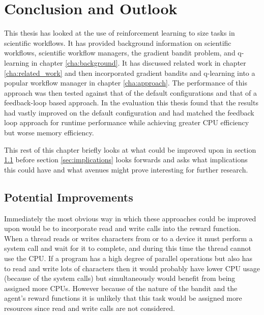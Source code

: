 
\cleardoublepage
\chapter{Conclusion and Outlook}
\label{cha:conclusion}

This thesis has looked at the use of reinforcement learning to size tasks in scientific workflows. It has provided background information on scientific workflows, scientific workflow managers, the gradient bandit problem, and q-learning in chapter \ref{cha:background}. It has discussed related work in chapter \ref{cha:related_work} and then incorporated gradient bandits and q-learning into a popular workflow manager in chapter \ref{cha:approach}. The performance of this approach was then tested against that of the default configurations and that of a feedback-loop based approach. In the evaluation this thesis found that the results had vastly improved on the default configuration and had matched the feedback loop approach for runtime performance while achieving greater CPU efficiency but worse memory efficiency.

This rest of this chapter briefly looks at what could be improved upon in section \ref{sec:pot_improvements} before section \ref{sec:implications} looks forwards and asks what implications this could have and what avenues might prove interesting for further research.

\section{Potential Improvements}
\label{sec:pot_improvements}

Immediately the most obvious way in which these approaches could be improved upon would be to incorporate read and write calls into the reward function. When a thread reads or writes characters from or to a device it must perform a system call and wait for it to complete, and during this time the thread cannot use the CPU. If a program has a high degree of parallel operations but also has to read and write lots of characters then it would probably have lower CPU usage (because of the system calls) but simultaneously would benefit from being assigned more CPUs. However because of the nature of the bandit and the agent’s reward functions it is unlikely that this task would be assigned more resources since read and write calls are not considered.

